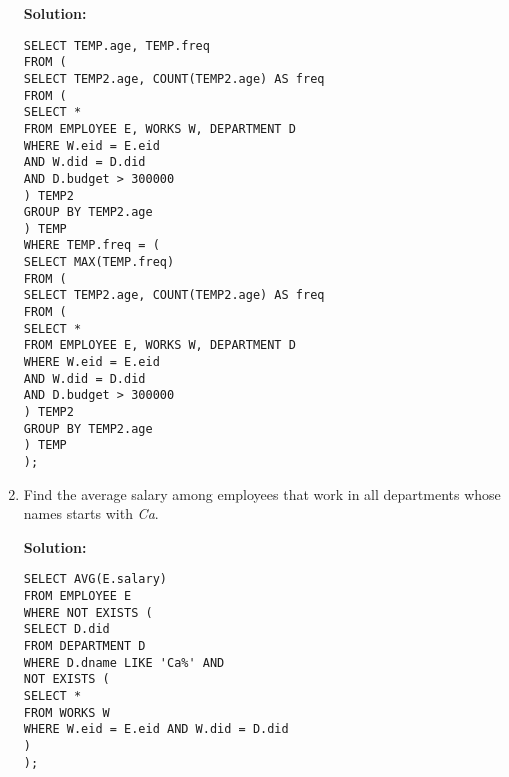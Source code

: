 \begin{enumerate}
\textbf{Solution:}
  
\begin{verbatim}
SELECT TEMP.age, TEMP.freq
FROM (
SELECT TEMP2.age, COUNT(TEMP2.age) AS freq
FROM (
SELECT *
FROM EMPLOYEE E, WORKS W, DEPARTMENT D
WHERE W.eid = E.eid
AND W.did = D.did
AND D.budget > 300000
) TEMP2
GROUP BY TEMP2.age
) TEMP
WHERE TEMP.freq = (
SELECT MAX(TEMP.freq)
FROM (
SELECT TEMP2.age, COUNT(TEMP2.age) AS freq
FROM (
SELECT *
FROM EMPLOYEE E, WORKS W, DEPARTMENT D
WHERE W.eid = E.eid
AND W.did = D.did
AND D.budget > 300000
) TEMP2
GROUP BY TEMP2.age
) TEMP
);
\end{verbatim}
  
\item Find the average salary among employees that work in all departments whose names starts with \textit{Ca}.
  
\textbf{Solution:}
  
\begin{verbatim}
SELECT AVG(E.salary)
FROM EMPLOYEE E
WHERE NOT EXISTS (
SELECT D.did
FROM DEPARTMENT D
WHERE D.dname LIKE 'Ca%' AND 
NOT EXISTS (
SELECT *
FROM WORKS W
WHERE W.eid = E.eid AND W.did = D.did
)
);
\end{verbatim}

\end{enumerate}
